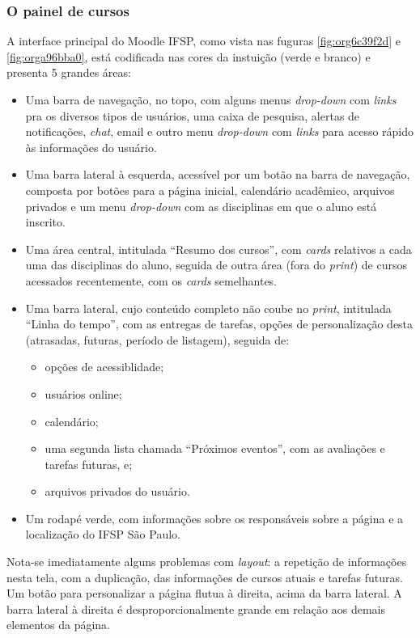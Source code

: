 \documentclass[11pt]{article}
\begin{document}
\subsubsection*{O painel de cursos}
\label{sec:orgf872776}
A interface principal do Moodle IFSP, como vista nas fuguras
\ref{fig:org6c39f2d} e \ref{fig:orga96bba0}, está codificada nas cores da instuição (verde e branco)
e presenta 5 grandes áreas:
\begin{itemize}
\item Uma barra de navegação, no topo, com alguns menus \emph{drop-down} com
\emph{links} pra os diversos tipos de usuários, uma caixa de pesquisa,
alertas de notificações, \emph{chat}, email e outro menu \emph{drop-down} com
\emph{links} para acesso rápido às informações do usuário.
\item Uma barra lateral à esquerda, acessível por um botão na barra de
navegação, composta por botões para a página inicial, calendário
acadêmico, arquivos privados e um menu \emph{drop-down} com as
disciplinas em que o aluno está inscrito.
\item Uma área central, intitulada ``Resumo dos cursos'', com \emph{cards}
relativos a cada uma das disciplinas do aluno, seguida de outra área
(fora do \emph{print}) de cursos acessados recentemente, com os \emph{cards} semelhantes.
\item Uma barra lateral, cujo conteúdo completo não coube no \emph{print},
intitulada ``Linha do tempo'', com as entregas de tarefas, opções de
personalização desta (atrasadas, futuras, período de listagem),
seguida de:
\begin{itemize}
\item opções de acessiblidade;
\item usuários online;
\item calendário;
\item uma segunda lista chamada ``Próximos eventos'', com as avaliações
e tarefas futuras, e;
\item arquivos privados do usuário.
\end{itemize}
\item Um rodapé verde, com informações sobre os responsáveis sobre a
página e a localização do IFSP São Paulo.
\end{itemize}

Nota-se imediatamente alguns problemas com \emph{layout}: a repetição de
informações nesta tela, com a duplicação, das informações de
cursos atuais e tarefas futuras. Um botão para personalizar a página
flutua à direita, acima da barra lateral. A barra lateral à direita é
desproporcionalmente grande em relação aos demais elementos da página.
\end{document}
